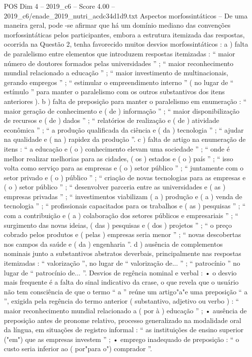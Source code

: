 \begin{textsample}{POS Dim 4 – 2019\_c6 – Score 4.00 – 2019\_c6/enade\_2019\_nutri\_acdc34d1d9.txt}
Aspectos morfossintáticos – De uma maneira geral, pode -se afirmar que há um domínio mediano das convenções morfossintáticas pelos participantes, embora a estrutura itemizada das respostas, ocorrida na Questão 2, tenha favorecido muitos desvios morfossintáticos : a ) falta de paralelismo entre elementos que introduzem respostas itemizadas : “ maior número de doutores formados pelas universidades ” ; “ maior reconhecimento mundial relacionado a educação ” ; “ maior investimento de multinacionais, gerando empregos ” ; “ estimular o empreendimento interno ” ( no lugar de “ estímulo ” para manter o paralelismo com os outros substantivos dos itens anteriores ). b ) falta de preposição para manter o paralelismo em enumeração : “ maior geração de conhecimento e ( de ) informação ” ; “ maior disponibilização de recursos e ( de ) dados ” ; “ relatórios de realização e ( de ) atividade econômica ” ; “ a produção qualificada da ciência e ( da ) tecnologia ” ; “ ajudar na qualidade e ( na ) rapidez da produção ”. c ) falta de artigo na enumeração de itens : “ a educação e ( o ) conhecimento elevam uma sociedade ” ; “ onde é melhor realizar melhorias para as cidades, ( os ) estados e ( o ) país ” ; “ isso volta como serviço para as empresas e ( o ) setor público ” ; “ juntamente com o setor privado e ( o ) público ” ; “ criação de novas tecnologias para as empresas e ( o ) setor público ” ; “ desenvolver parceria entre as universidades e ( as ) empresas privadas ” ; “ investimentos viabilizam ( a ) produção e ( a ) venda de tecnologia ” ; “ profissionais capacitados para os trabalhos e ( as ) pesquisas ” ; “ com a contribuição e ( a ) colaboração dos setores públicos e empresariais ” ; “ surgimento das novas ideias, ( das ) pesquisas e ( dos ) projetos ” ; “ o preço cobrado pelos produtos e ( pelas ) empresas seria menor ” ; “ novas descobertas nos campos da saúde e ( da ) engenharia ”. d ) ausência de complementos nominais junto a substantivos abstratos deverbais, principalmente nas respostas itemizadas : “ valorização ”, no lugar de “ valorização de... ” ; “ patrocínio ” no lugar de “ patrocínio de... ”.
Desvios de regência nominal e verbal : • o desvio mais frequente é a falta do sinal indicativo da crase, o que revela que o usuário não tem consciência de que o termo “ a ” reúne um artigo"a"e uma preposição “ a ”, exigida pela regência do termo anterior ( substantivo, adjetivo ou verbo ) : “ maior reconhecimento mundial relacionado a ( por à ) educação ” ; • ausência de preposição antes de pronome relativo, processo generalizado na modalidade oral da língua, em situações de registro informal : “ as instituições de ensino superior ("em") que as empresas investem ” ; • emprego inadequado de preposição : “ o custo seria inferior ao ( por"para o") comprador ”.

\end{textsample}
